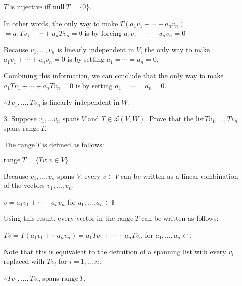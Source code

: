 \documentclass{article}
\begin{document}
\begin{enumerate}[nolistsep]
	$T$ is injective iff $\text{null}\ T = \{0\}$.
	
	In other words, the only way to make $T(a_1v_1 + \cdots + a_nv_n)$\newline$= a_1Tv_1 + \cdots + a_nTv_n = 0$ is by forcing $a_1v_1 + \cdots + a_nv_n = 0$ 
	
	Because $v_1,...,v_n$ is linearly independent in $V$, the only way to make $a_1v_1 + \cdots + a_nv_n = 0$ is by setting $a_1 = \cdots = a_n = 0$.
	
	Combining this information, we can conclude that the only way to make $a_1Tv_1 + \cdots + a_nTv_n = 0$ is by setting $a_1 = \cdots = a_n = 0$.
	
	$\therefore Tv_1,...,Tv_n$ is linearly independent in $W$.
	
		\item[3.] Suppose $v_1,...v_n$ spans $V$ and $T \in \mathcal{L}(V,W)$. Prove that the list\newline $Tv_1,...,Tv_n$ spans $\text{range}\ T$.

		The $\text{range}\ T$ is defined as follows:
		
		$\text{range}\ T = \{Tv : v \in V\}$
		
		Because $v_1,...,v_n$ spans $V$, every $v \in V$ can be written as a linear combination of the vectors $v_1,...,v_n$:
		
		$v = a_1v_1 + \cdots + a_nv_n$ for $a_1,...,a_n \in \mathbb{F}$
		
		Using this result, every vector in the $\text{range}\ T$ can be written as follows:
		
		$Tv = T(a_1v_1 + \cdots a_nv_n) = a_1Tv_1 + \cdots + a_nTv_n$ for $a_1,...,a_n \in \mathbb{F}$
		
		Note that this is equivalent to the definition of a spanning list with every $v_i$ replaced with $Tv_i$ for $i = 1,....n$.
		
		$\therefore Tv_1,...,Tv_n$ spans $\text{range}\ T$.
		
		
		
		
	\end{enumerate}
\end{document}
